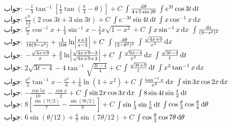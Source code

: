 جواب:\quad
$-\tfrac{1}{3}\tan^{-1}[\tfrac{1}{3}\tan(\tfrac{\pi}{4}-\theta)]+C$
$\int \frac{\dif \theta}{4+5\sin 2\theta}$
$\int e^{2t}\cos 3t \dif t$\\
جواب:\quad
$\tfrac{e^{2t}}{13}(2\cos 3t+3\sin 3t)+C$
$\int e^{-3t}\sin 4t\dif t$
$\int x \cos^{-1} x\dif x$\\
جواب:\quad
$\tfrac{x^2}{2}\cos^{-1}x+\tfrac{1}{4}\sin^{-1}x-\tfrac{1}{4}x\sqrt{1-x^2}+C$
$\int x\sin^{-1}x\dif x$
$\int\frac{\dif s}{(9-s^2)^2}$\\
جواب:\quad
$\tfrac{s}{18(9-s^2)}+\tfrac{1}{108}\ln\abs{\tfrac{s+3}{s-3}}+C$
$\int \frac{\dif \theta}{(2-\theta^2)^2}$
$\int \frac{\sqrt{4x+9}}{x^2}\dif x$\\
جواب:\quad
$-\tfrac{\sqrt{4x+9}}{x}+\tfrac{2}{3}\ln\abs{\tfrac{\sqrt{4x+9}-3}{\sqrt{4x+9}+3}}+C$
$\int\frac{\sqrt{9x-4}}{x^2}\dif x$
$\int\frac{\sqrt{3t-4}}{t}\dif t$\\
جواب:\quad
$2\sqrt{3t-4}-4\tan^{-1}\sqrt{\tfrac{3t-4}{4}}+C$
$\int\frac{\sqrt{3t+9}}{t}\dif t$
$\int x^2\tan^{-1}x\dif x$\\
جواب:\quad
$\tfrac{x^3}{3}\tan^{-1}x-\tfrac{x^2}{6}+\tfrac{1}{6}\ln(1+x^2)+C$
$\int \frac{\tan^{-1}x}{x^2}\dif x$
$\int \sin 3x\cos 2x\dif x$\\
جواب:\quad
$-\tfrac{\cos5x}{10}-\tfrac{\cos x}{2}+C$
$\int \sin 2x\cos 3x\dif x$
$\int 8\sin 4t\sin\frac{t}{2}\dif t$\\
جواب:\quad
$8[\tfrac{\sin(7t/2)}{7}-\tfrac{\sin(9t/2)}{9}]+C$
$\int \sin\frac{t}{3}\sin \frac{t}{6}\dif t$
$\int \cos\frac{\theta}{3}\cos\frac{\theta}{4}\dif \theta$\\
جواب:\quad
$6\sin(\theta/12)+\tfrac{6}{7}\sin(7\theta/12)+C$
$\int \cos\frac{\theta}{2}\cos 7\theta \dif \theta$

